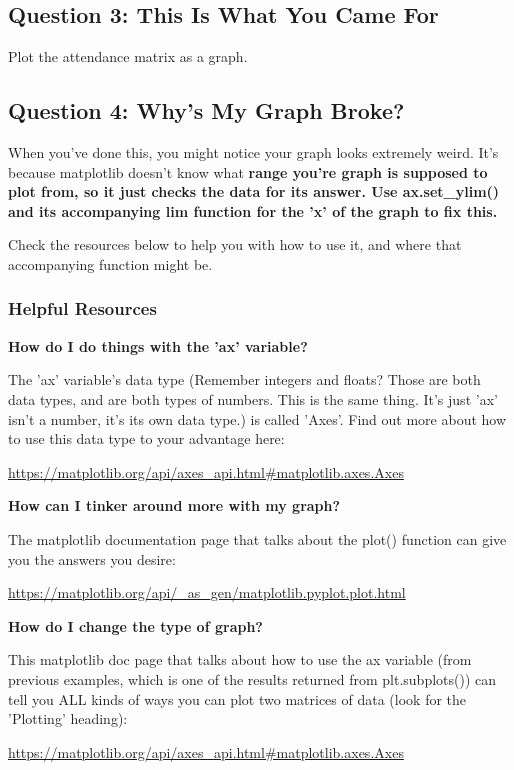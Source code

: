 \documentclass{article}
\begin{document}
    \subsection{Question 3: This Is What You Came For}
    Plot the attendance matrix as a graph.

    \subsection{Question 4: Why's My Graph Broke?}
    When you've done this, you might notice your graph looks extremely weird. It's because matplotlib doesn't know what \bfseries range \mdseries you're graph is supposed to plot from, so it just checks the data for its answer. Use ax.set\_ylim() and its accompanying lim function for the 'x' of the graph to fix this.

    Check the resources below to help you with how to use it, and where that accompanying function might be.

    \subsubsection{Helpful Resources}
    \bfseries How do I do things with the 'ax' variable? \mdseries

    The 'ax' variable's data type (Remember integers and floats? Those are both data types, and are both types of numbers. This is the same thing. It's just 'ax' isn't a number, it's its own data type.) is called 'Axes'. Find out more about how to use this data type to your advantage here:

    \url{https://matplotlib.org/api/axes_api.html#matplotlib.axes.Axes}

    \bfseries How can I tinker around more with my graph? \mdseries
    
    The matplotlib documentation page that talks about the plot() function can give you the answers you desire:

    \url{https://matplotlib.org/api/_as_gen/matplotlib.pyplot.plot.html}

    \bfseries How do I change the type of graph? \mdseries
    
    This matplotlib doc page that talks about how to use the ax variable (from previous examples, which is one of the results returned from plt.subplots()) can tell you ALL kinds of ways you can plot two matrices of data (look for the 'Plotting' heading):
    
    \url{https://matplotlib.org/api/axes_api.html#matplotlib.axes.Axes}
\end{document}
